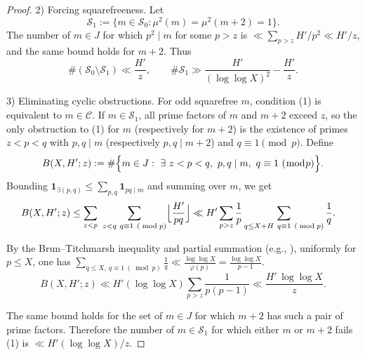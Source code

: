 \documentclass[12pt]{article}
\renewcommand{\tag}[1]{}
\theoremstyle{remark}
\begin{document}
\begin{proof}
2) Forcing squarefreeness. Let
$$\mathcal{S}_1:=\{m\in\mathcal{S}_0: \mu^2(m)=\mu^2(m+2)=1\}.$$
The number of $m\in J$ for which $p^2\mid m$ for some $p>z$ is $\ll\sum_{p>z} H'/p^2\ll H'/z$, and the same bound holds for $m+2$. Thus
$$\#(\mathcal{S}_0\setminus\mathcal{S}_1)\ll \frac{H'}{z},\qquad \#\mathcal{S}_1\gg \frac{H'}{(\log\log X)^2}-\frac{H'}{z}.\tag{6}$$

3) Eliminating cyclic obstructions. For odd squarefree $m$, condition (1) is equivalent to $m\in\mathcal C$. If $m\in\mathcal{S}_1$, all prime factors of $m$ and $m+2$ exceed $z$, so the only obstruction to (1) for $m$ (respectively for $m+2$) is the existence of primes $z<p<q$ with $p,q\mid m$ (respectively $p,q\mid m+2$) and $q\equiv 1\pmod p$. Define
$$B(X,H';z):=\#\Bigl\{m\in J:\ \exists\ z<p<q,\ p,q\mid m,\ q\equiv 1\ (\bmod p)\Bigr\}.$$
Bounding $\mathbf{1}_{\exists(p,q)}\le\sum_{p,q}\mathbf{1}_{pq\mid m}$ and summing over $m$, we get
\begin{align*}
B(X,H';z)
&\le \sum_{z<p}\ \sum_{\substack{z<q\ q\equiv 1\ (\bmod p)}}\Bigl\lfloor \frac{H'}{pq}\Bigr\rfloor
\ll H'\sum_{p>z}\frac{1}{p}\sum_{\substack{q\le X+H\ q\equiv 1\ (\bmod p)}}\frac{1}{q}.
\end{align*}
\begin{flushleft}
By the Brun--Titchmarsh inequality and partial summation (e.g., \cite{MV2007,IK2004}), uniformly for $p\le X$, one has $\sum_{q\le X,\ q\equiv 1\ (\bmod p)}\!\frac{1}{q}\ll \frac{\log\log X}{\varphi(p)}=\frac{\log\log X}{p-1}$.
$$B(X,H';z)\ll H'(\log\log X)\sum_{p>z}\frac{1}{p(p-1)}\ll \frac{H'\,\log\log X}{z}.\tag{7}$$
\end{flushleft}
The same bound holds for the set of $m\in J$ for which $m+2$ has such a pair of prime factors. Therefore the number of $m\in\mathcal{S}_1$ for which either $m$ or $m+2$ fails (1) is $\ll H'(\log\log X)/z$.


\end{proof}
\end{document}
